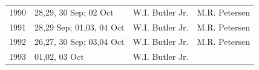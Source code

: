 \documentclass[]{article}
\begin{document}
\begin{longtable}[]{@{}llll@{}}
\begin{minipage}[t]{0.12\columnwidth}\raggedright\strut
1990\strut
\end{minipage} & \begin{minipage}[t]{0.38\columnwidth}\raggedright\strut
28,29, 30 Sep; 02 Oct\strut
\end{minipage} & \begin{minipage}[t]{0.18\columnwidth}\raggedright\strut
W.I. Butler Jr.\strut
\end{minipage} & \begin{minipage}[t]{0.20\columnwidth}\raggedright\strut
M.R. Petersen\strut
\end{minipage}\tabularnewline
\begin{minipage}[t]{0.12\columnwidth}\raggedright\strut
1991\strut
\end{minipage} & \begin{minipage}[t]{0.38\columnwidth}\raggedright\strut
28,29 Sep; 01,03, 04 Oct\strut
\end{minipage} & \begin{minipage}[t]{0.18\columnwidth}\raggedright\strut
W.I. Butler Jr.\strut
\end{minipage} & \begin{minipage}[t]{0.20\columnwidth}\raggedright\strut
M.R. Petersen\strut
\end{minipage}\tabularnewline
\begin{minipage}[t]{0.12\columnwidth}\raggedright\strut
1992\strut
\end{minipage} & \begin{minipage}[t]{0.38\columnwidth}\raggedright\strut
26,27, 30 Sep; 03,04 Oct\strut
\end{minipage} & \begin{minipage}[t]{0.18\columnwidth}\raggedright\strut
W.I. Butler Jr.\strut
\end{minipage} & \begin{minipage}[t]{0.20\columnwidth}\raggedright\strut
M.R. Petersen\strut
\end{minipage}\tabularnewline
\begin{minipage}[t]{0.12\columnwidth}\raggedright\strut
1993\strut
\end{minipage} & \begin{minipage}[t]{0.38\columnwidth}\raggedright\strut
01,02, 03 Oct\strut
\end{minipage} & \begin{minipage}[t]{0.18\columnwidth}\raggedright\strut
W.I. Butler Jr.\strut
\end{minipage} & \begin{minipage}[t]{0.20\columnwidth}\raggedright\strut

\end{minipage}
\end{longtable}
\end{document}
